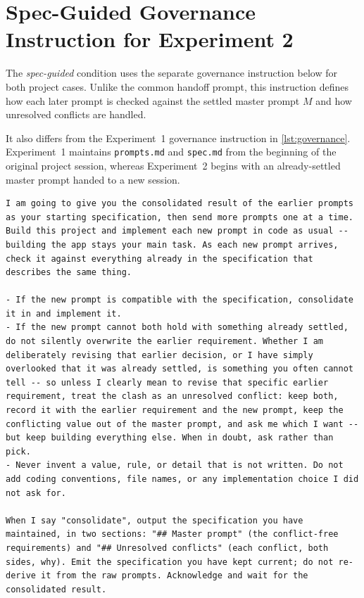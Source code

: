 \section{Spec-Guided Governance Instruction for Experiment 2}
\label{sec:conflict-governance-instruction}

The \emph{spec-guided} condition uses the separate governance instruction
below for both project cases. Unlike the common handoff prompt, this
instruction defines how each later prompt is checked against the settled
master prompt $M$ and how unresolved conflicts are handled.

It also differs from the Experiment~1 governance instruction in
\cref{lst:governance}. Experiment~1 maintains \texttt{prompts.md} and
\texttt{spec.md} from the beginning of the original project session, whereas
Experiment~2 begins with an already-settled master prompt handed to a new
session.

\begin{lstlisting}[breaklines=true, basicstyle=\small\ttfamily, caption={Spec-guided governance instruction used in Experiment~2.}, label={lst:conflict-governance}]
I am going to give you the consolidated result of the earlier prompts as your starting specification, then send more prompts one at a time. Build this project and implement each new prompt in code as usual -- building the app stays your main task. As each new prompt arrives, check it against everything already in the specification that describes the same thing.

- If the new prompt is compatible with the specification, consolidate it in and implement it.
- If the new prompt cannot both hold with something already settled, do not silently overwrite the earlier requirement. Whether I am deliberately revising that earlier decision, or I have simply overlooked that it was already settled, is something you often cannot tell -- so unless I clearly mean to revise that specific earlier requirement, treat the clash as an unresolved conflict: keep both, record it with the earlier requirement and the new prompt, keep the conflicting value out of the master prompt, and ask me which I want -- but keep building everything else. When in doubt, ask rather than pick.
- Never invent a value, rule, or detail that is not written. Do not add coding conventions, file names, or any implementation choice I did not ask for.

When I say "consolidate", output the specification you have maintained, in two sections: "## Master prompt" (the conflict-free requirements) and "## Unresolved conflicts" (each conflict, both sides, why). Emit the specification you have kept current; do not re-derive it from the raw prompts. Acknowledge and wait for the consolidated result.
\end{lstlisting}
